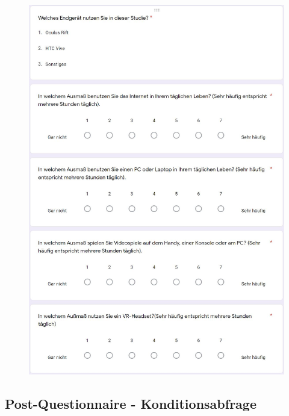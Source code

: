 \documentclass[a4paper,11pt]{article}%
\renewcommand{\\}{\vspace*{0.5\baselineskip} \newline}
\begin{document}
{{	\begin{figure}[H]
	\centering
		\begin{footnotesize}
			\includegraphics[scale=0.6]{Abbildungen/Fragebogen/Pre-Questionnaire/PQ6}\\
		\end{footnotesize}
	\end{figure}	
	
\subsection{Post-Questionnaire - Konditionsabfrage}
\label{Post-Questionnaire}
\label{Post-Questionnaire - Konditionsabfrage}

}}
\end{document}
